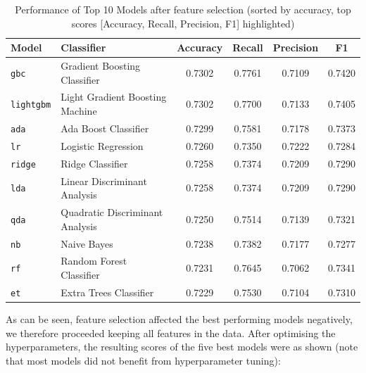 \documentclass[a4paper,12pt]{article}
\begin{document}
\begin{table}[H]
    \centering
    \begin{tabular}{l l c c c c}
    \toprule
    \textbf{Model} & \textbf{Classifier} & \textbf{Accuracy} & \textbf{Recall} & \textbf{Precision} & \textbf{F1} \\
    \midrule
    \texttt{gbc} & Gradient Boosting Classifier & \cellcolor{yellow}0.7302 & \cellcolor{yellow}0.7761 & 0.7109 & \cellcolor{yellow}0.7420 \\
    \texttt{lightgbm} & Light Gradient Boosting Machine & 0.7302 & 0.7700 & 0.7133 & 0.7405 \\
    \texttt{ada} & Ada Boost Classifier & 0.7299 & 0.7581 & 0.7178 & 0.7373 \\
    \texttt{lr} & Logistic Regression & 0.7260 & 0.7350 & \cellcolor{yellow}0.7222 & 0.7284 \\
    \texttt{ridge} & Ridge Classifier & 0.7258 & 0.7374 & 0.7209 & 0.7290 \\
    \texttt{lda} & Linear Discriminant Analysis & 0.7258 & 0.7374 & 0.7209 & 0.7290 \\
    \texttt{qda} & Quadratic Discriminant Analysis & 0.7250 & 0.7514 & 0.7139 & 0.7321 \\
    \texttt{nb} & Naive Bayes & 0.7238 & 0.7382 & 0.7177 & 0.7277 \\
    \texttt{rf} & Random Forest Classifier & 0.7231 & 0.7645 & 0.7062 & 0.7341 \\
    \texttt{et} & Extra Trees Classifier & 0.7229 & 0.7530 & 0.7104 & 0.7310 \\
    \bottomrule
    \end{tabular}
    \caption{Performance of Top 10 Models after feature selection (sorted by accuracy, top scores [Accuracy, Recall, Precision, F1] highlighted)}
    \label{tab:model_performance_fs}
\end{table}
    
As can be seen, feature selection affected the best performing models negatively, we therefore 
proceeded keeping all features in the data.
After optimising the hyperparameters, the resulting scores of the five best models were as shown
(note that most models did not benefit from hyperparameter tuning): 
\end{document}
